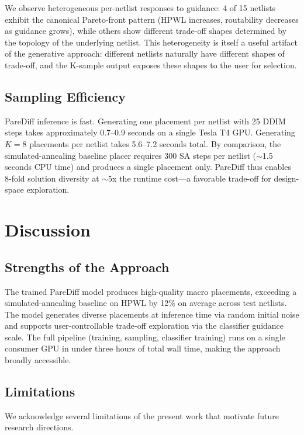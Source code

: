 \documentclass{ieeeaccess}
\begin{document}
We observe heterogeneous per-netlist responses to guidance: 4 of 15 netlists exhibit the canonical Pareto-front pattern (HPWL increases, routability decreases as guidance grows), while others show different trade-off shapes determined by the topology of the underlying netlist. This heterogeneity is itself a useful artifact of the generative approach: different netlists naturally have different shapes of trade-off, and the K-sample output exposes these shapes to the user for selection.

\subsection{Sampling Efficiency}

PareDiff inference is fast. Generating one placement per netlist with 25 DDIM steps takes approximately 0.7--0.9 seconds on a single Tesla T4 GPU. Generating $K = 8$ placements per netlist takes 5.6--7.2 seconds total. By comparison, the simulated-annealing baseline placer requires 300 SA steps per netlist ($\sim$1.5 seconds CPU time) and produces a single placement only. PareDiff thus enables 8-fold solution diversity at $\sim$5x the runtime cost---a favorable trade-off for design-space exploration.

\section{Discussion}
\label{sec:discussion}

\subsection{Strengths of the Approach}

The trained PareDiff model produces high-quality macro placements, exceeding a simulated-annealing baseline on HPWL by 12\% on average across test netlists. The model generates diverse placements at inference time via random initial noise and supports user-controllable trade-off exploration via the classifier guidance scale. The full pipeline (training, sampling, classifier training) runs on a single consumer GPU in under three hours of total wall time, making the approach broadly accessible.

\subsection{Limitations}

We acknowledge several limitations of the present work that motivate future research directions.
\end{document}
